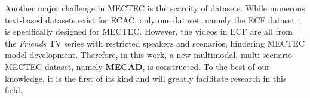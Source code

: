 \documentclass[11pt]{article}
\begin{document}
Another major challenge in MECTEC is the scarcity of datasets.
While numerous text-based datasets exist for ECAC, only one dataset, namely the ECF dataset~\cite{ecf}, is specifically designed for MECTEC.
However, the videos in ECF are all from the \textit{Friends} TV series with restricted speakers and scenarios, hindering MECTEC model development.
Therefore, in this work, a new multimodal, multi-scenario MECTEC dataset, namely \textbf{MECAD}, is constructed.
To the best of our knowledge, it is the first of its kind and will greatly facilitate research in this field.
\end{document}
